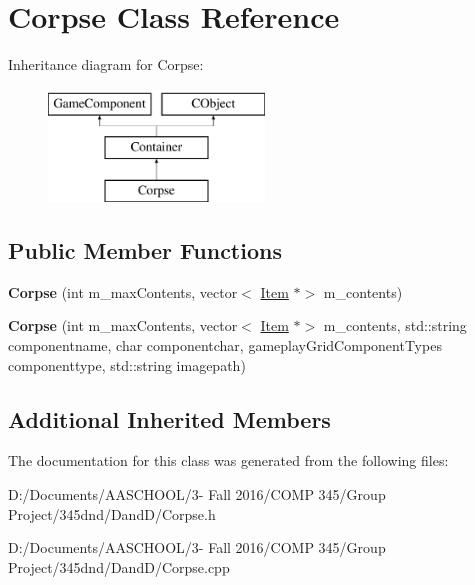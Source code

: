 \hypertarget{class_corpse}{}\section{Corpse Class Reference}
\label{class_corpse}
Inheritance diagram for Corpse\+:\begin{figure}[H]
\begin{center}
\leavevmode
\includegraphics[height=3.000000cm]{class_corpse}
\end{center}
\end{figure}
\subsection*{Public Member Functions}
\begin{DoxyCompactItemize}
\item 
\hypertarget{class_corpse_ab10d9a7d6a17532557bc0d3973e64bc2}{}\label{class_corpse_ab10d9a7d6a17532557bc0d3973e64bc2} 
{\bfseries Corpse} (int m\+\_\+max\+Contents, vector$<$ \hyperlink{class_item}{Item} $\ast$$>$ m\+\_\+contents)
\item 
\hypertarget{class_corpse_a71bee6f8ee28952861d4f12771eeff93}{}\label{class_corpse_a71bee6f8ee28952861d4f12771eeff93} 
{\bfseries Corpse} (int m\+\_\+max\+Contents, vector$<$ \hyperlink{class_item}{Item} $\ast$$>$ m\+\_\+contents, std\+::string componentname, char componentchar, gameplay\+Grid\+Component\+Types componenttype, std\+::string imagepath)
\end{DoxyCompactItemize}
\subsection*{Additional Inherited Members}


The documentation for this class was generated from the following files\+:\begin{DoxyCompactItemize}
\item 
D\+:/\+Documents/\+A\+A\+S\+C\+H\+O\+O\+L/3-\/ Fall 2016/\+C\+O\+M\+P 345/\+Group Project/345dnd/\+Dand\+D/Corpse.\+h\item 
D\+:/\+Documents/\+A\+A\+S\+C\+H\+O\+O\+L/3-\/ Fall 2016/\+C\+O\+M\+P 345/\+Group Project/345dnd/\+Dand\+D/Corpse.\+cpp\end{DoxyCompactItemize}
